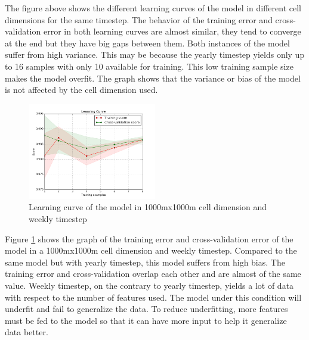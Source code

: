 \documentclass[a0]{sciposter}
\begin{document}
\begin{multicols}{2}
    The figure above shows the different learning curves of the model in different cell dimensions for the same timestep. The behavior of the training error and cross-validation error in both learning curves are almost similar, they tend to converge at the end but they have big gaps between them. Both instances of the model suffer from high variance. This may be because the yearly timestep yields only up to 16 samples with only 10 available for training. This low training sample size makes the model overfit. The graph shows that the variance or bias of the model is not affected by the cell dimension used.

    \begin{figure}
      \centering
      \includegraphics[width=0.5\textwidth]{1000_weekly_False}
      \caption{Learning curve of the model in 1000mx1000m cell dimension and weekly timestep}
      \label{fig:learning-curve2}
    \end{figure}

    Figure \ref{fig:learning-curve2} shows the graph of the training error and cross-validation error of the model in a 1000mx1000m cell dimension and weekly timestep. Compared to the same model but with yearly timestep, this model suffers from high bias. The training error and cross-validation overlap each other and are almost of the same value. Weekly timestep, on the contrary to yearly timestep, yields a lot of data with respect to the number of features used. The model under this condition will underfit and fail to generalize the data. To reduce underfitting, more features must be fed to the model so that it can have more input to help it generalize data better.


\end{multicols}
\end{document}
